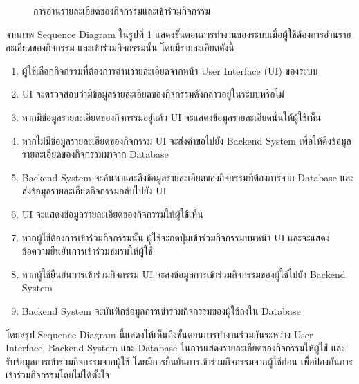 \documentclass[14pt,oneside,openright,a4paper]{cpe-thai-project}
\begin{document}
  \begin{figure}[!h]\centering
    \setlength{\fboxrule}{0.5mm} %
    \setlength{\fboxsep}{0.5cm}
    \caption{การอ่านรายละเอียดของกิจกรรมและเข้าร่วมกิจกรรม}\label{fig:Select and join event}
  \end{figure}

  จากภาพ Sequence Diagram ในรูปที่ \ref{fig:Select and join event} แสดงขั้นตอนการทำงานของระบบเมื่อผู้ใช้ต้องการอ่านรายละเอียดของกิจกรรม และเข้าร่วมกิจกรรมนั้น โดยมีรายละเอียดดังนี้
  \begin{enumerate}
    \item ผู้ใช้เลือกกิจกรรมที่ต้องการอ่านรายละเอียดจากหน้า User Interface (UI) ของระบบ
    \item UI จะตรวจสอบว่ามีข้อมูลรายละเอียดของกิจกรรมดังกล่าวอยู่ในระบบหรือไม่
    \item หากมีข้อมูลรายละเอียดของกิจกรรมอยู่แล้ว UI จะแสดงข้อมูลรายละเอียดนั้นให้ผู้ใช้เห็น
    \item หากไม่มีข้อมูลรายละเอียดของกิจกรรม UI จะส่งคำขอไปยัง Backend System เพื่อให้ดึงข้อมูลรายละเอียดของกิจกรรมมาจาก Database
    \item Backend System จะค้นหาและดึงข้อมูลรายละเอียดของกิจกรรมที่ต้องการจาก Database และส่งข้อมูลรายละเอียดกิจกรรมกลับไปยัง UI
    \item UI จะแสดงข้อมูลรายละเอียดของกิจกรรมให้ผู้ใช้เห็น
    \item หากผู้ใช้ต้องการเข้าร่วมกิจกรรมนั้น ผู้ใช้จะกดปุ่มเข้าร่วมกิจกรรมบนหน้า UI และจะแสดงข้อความยืนยันการเข้าร่วมชมรมให้ผู้ใช้
    \item หากผู้ใช้ยืนยันการเข้าร่วมกิจกรรม UI จะส่งข้อมูลการเข้าร่วมกิจกรรมของผู้ใช้ไปยัง Backend System
    \item Backend System จะบันทึกข้อมูลการเข้าร่วมกิจกรรมของผู้ใช้ลงใน Database
  \end{enumerate}
  โดยสรุป Sequence Diagram นี้แสดงให้เห็นถึงขั้นตอนการทำงานร่วมกันระหว่าง User Interface, Backend System และ Database ในการแสดงรายละเอียดของกิจกรรมให้ผู้ใช้ และรับข้อมูลการเข้าร่วมกิจกรรมจากผู้ใช้ โดยมีการยืนยันการเข้าร่วมกิจกรรมจากผู้ใช้ก่อน เพื่อป้องกันการเข้าร่วมกิจกรรมโดยไม่ได้ตั้งใจ
\end{document}
